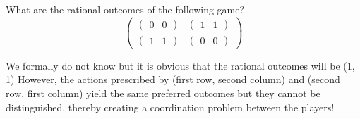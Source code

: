 \begin{example}
    What are the rational outcomes of the following game?
    \[\begin{pmatrix}
        \begin{pmatrix} 0 & 0 \end{pmatrix} & \begin{pmatrix} 1 & 1 \end{pmatrix} \\
        \begin{pmatrix} 1 & 1 \end{pmatrix} & \begin{pmatrix} 0 & 0 \end{pmatrix}
    \end{pmatrix}\]

    We formally do not know but it is obvious that the rational outcomes will be (1, 1)
    However, the actions prescribed by (first row, second column) and (second row, first column) yield the same preferred outcomes but they cannot be distinguished, thereby creating a coordination problem between the players!



\end{example}
